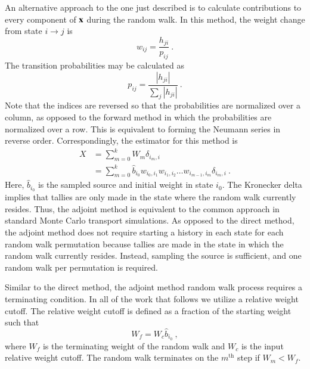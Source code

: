 \documentclass[preprint,12pt]{elsarticle}
\newcommand{\vx}{\ensuremath{\ve{x}}}
\begin{document}
An alternative approach to the one just described is to calculate
contributions to every component of $\vx$ during the random walk. In
this method, the weight change from state $i\rightarrow j$ is
\begin{equation}
  w_{ij} = \frac{h_{ji}}{p_{ij}}\:.
  \label{eq:adjoint-weight}
\end{equation}
The transition probabilities may be calculated as
\begin{equation}
  p_{ij} = \frac{|h_{ji}|}{\sum_{j}|h_{ji}|}\:.
  \label{eq:adjoint-probability}
\end{equation}
Note that the indices are reversed so that the probabilities are normalized
over a column, as opposed to the forward method in which the probabilities are
normalized over a row.  This is equivalent to forming the Neumann series in
reverse order.  Correspondingly, the estimator for this method is
\begin{equation}
  \begin{split}
    X &= \sum_{m=0}^{k}W_m\delta_{i_m,i}\\ &=
    \sum_{m=0}^{k}\hat{b}_{i_0}w_{i_0,i_1}w_{i_1,i_2}\ldots
    w_{i_{m-1},i_m}\delta_{i_m,i}\:.
  \end{split}
  \label{eq:adjoint-tally}
\end{equation}
Here, $\hat{b}_{i_0}$ is the sampled source and initial weight in state $i_0$.
The Kronecker delta implies that tallies are only made in the state where the
random walk currently resides.  Thus, the adjoint method is equivalent to the
common approach in standard Monte Carlo transport simulations. As opposed to
the direct method, the adjoint method does not require starting a history in
each state for each random walk permutation because tallies are made in the
state in which the random walk currently resides. Instead, sampling the source
is sufficient, and one random walk per permutation is required.

Similar to the direct method, the adjoint method random walk process
requires a terminating condition.  In all of the work that follows we
utilize a relative weight cutoff.  The relative weight cutoff is
defined as a fraction of the starting weight such that
\begin{equation}
  W_f = W_c\hat{b}_{i_0}\:,
  \label{eq:weight_cutoff}
\end{equation}
where $W_f$ is the terminating weight of the random walk and $W_c$ is
the input relative weight cutoff. The random walk terminates on the
$m^\text{th}$ step if $W_m < W_f$.
\end{document}
